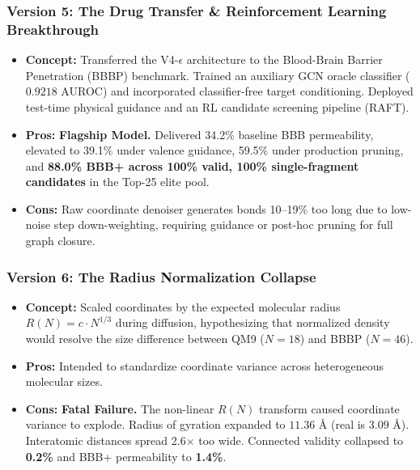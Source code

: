 \documentclass[11pt, a4paper]{article}
\begin{document}
\subsubsection{Version 5: The Drug Transfer \& Reinforcement Learning Breakthrough}
\begin{itemize}[noitemsep]
    \item \textbf{Concept:} Transferred the V4-$\epsilon$ architecture to the Blood-Brain Barrier Penetration (BBBP) benchmark. Trained an auxiliary GCN oracle classifier ($0.9218$ AUROC) and incorporated classifier-free target conditioning. Deployed test-time physical guidance and an RL candidate screening pipeline (RAFT).
    \item \textbf{Pros:} \textbf{Flagship Model.} Delivered 34.2\% baseline BBB permeability, elevated to 39.1\% under valence guidance, 59.5\% under production pruning, and \textbf{88.0\% BBB+ across 100\% valid, 100\% single-fragment candidates} in the Top-25 elite pool.
    \item \textbf{Cons:} Raw coordinate denoiser generates bonds 10--19\% too long due to low-noise step down-weighting, requiring guidance or post-hoc pruning for full graph closure.
\end{itemize}

\subsubsection{Version 6: The Radius Normalization Collapse}
\begin{itemize}[noitemsep]
    \item \textbf{Concept:} Scaled coordinates by the expected molecular radius $R(N) = c \cdot N^{1/3}$ during diffusion, hypothesizing that normalized density would resolve the size difference between QM9 ($N=18$) and BBBP ($N=46$).
    \item \textbf{Pros:} Intended to standardize coordinate variance across heterogeneous molecular sizes.
    \item \textbf{Cons:} \textbf{Fatal Failure.} The non-linear $R(N)$ transform caused coordinate variance to explode. Radius of gyration expanded to $11.36\text{ \AA}$ (real is $3.09\text{ \AA}$). Interatomic distances spread 2.6$\times$ too wide. Connected validity collapsed to \textbf{0.2\%} and BBB+ permeability to \textbf{1.4\%}.
\end{itemize}
\end{document}
